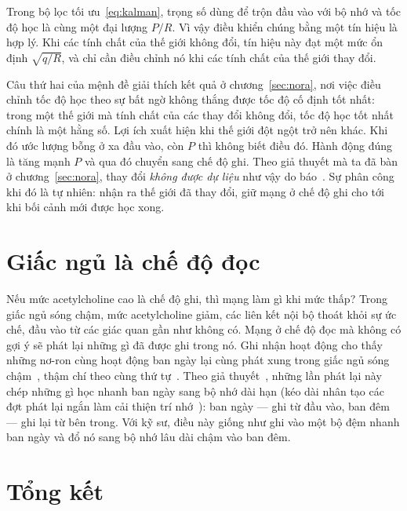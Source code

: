 \begin{keyblock}
\begin{proposition}
\label{prop:kalman}
Trong bộ lọc tối ưu~\eqref{eq:kalman}, trọng số dùng để trộn đầu vào với bộ nhớ và tốc độ học là cùng một đại lượng $P/R$. Vì vậy điều khiển chúng bằng một tín hiệu là hợp lý. Khi các tính chất của thế giới không đổi, tín hiệu này đạt một mức ổn định $\sqrt{q/R}$, và chỉ cần điều chỉnh nó khi các tính chất của thế giới thay đổi.
\end{proposition}
\end{keyblock}

Câu thứ hai của mệnh đề giải thích kết quả ở chương~\ref{sec:nora}, nơi việc điều chỉnh tốc độ học theo sự bất ngờ không thắng được tốc độ cố định tốt nhất: trong một thế giới mà tính chất của các thay đổi không đổi, tốc độ học tốt nhất chính là một hằng số. Lợi ích xuất hiện khi thế giới đột ngột trở nên khác. Khi đó ước lượng bỗng ở xa đầu vào, còn $P$ thì không biết điều đó. Hành động đúng là tăng mạnh $P$ và qua đó chuyển sang chế độ ghi. Theo giả thuyết mà ta đã bàn ở chương~\ref{sec:nora}, thay đổi \emph{không được dự liệu} như vậy do  báo~\cite{YuDayan2005}. Sự phân công khi đó là tự nhiên:  nhận ra thế giới đã thay đổi,  giữ mạng ở chế độ ghi cho tới khi bối cảnh mới được học xong.

\section{Giấc ngủ là chế độ đọc}

Nếu mức acetylcholine cao là chế độ ghi, thì mạng làm gì khi mức thấp? Trong giấc ngủ sóng chậm, mức acetylcholine giảm, các liên kết nội bộ thoát khỏi sự ức chế, đầu vào từ các giác quan gần như không có. Mạng ở chế độ đọc mà không có gợi ý sẽ phát lại những gì đã được ghi trong nó. Ghi nhận hoạt động cho thấy những nơ-ron cùng hoạt động ban ngày lại cùng phát xung trong giấc ngủ sóng chậm~\cite{WilsonMcNaughton1994}, thậm chí theo cùng thứ tự~\cite{Skaggs1996}. Theo giả thuyết~\cite{Hasselmo1999}, những lần phát lại này chép những gì học nhanh ban ngày sang bộ nhớ dài hạn (kéo dài nhân tạo các đợt phát lại ngắn làm cải thiện trí nhớ~\cite{FernandezRuiz2019}): ban ngày --- ghi từ đầu vào, ban đêm --- ghi lại từ bên trong. Với kỹ sư, điều này giống như ghi vào một bộ đệm nhanh ban ngày và đổ nó sang bộ nhớ lâu dài chậm vào ban đêm.

\section{Tổng kết}

